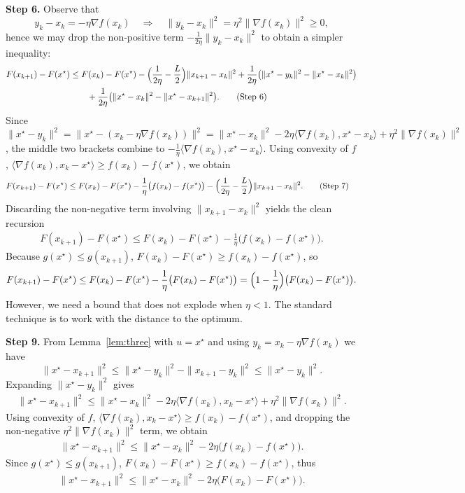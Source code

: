 \documentclass{article}
\begin{document}
\noindent\textbf{Step 6.} Observe that
\[
y_k-x_k = -\eta\nabla f(x_k) \quad\Longrightarrow\quad
\|y_k-x_k\|^2 = \eta^2\|\nabla f(x_k)\|^2\ge0,
\]
hence we may drop the non‑positive term $-\frac{1}{2\eta}\|y_k-x_k\|^2$ to obtain a simpler inequality:
\begin{align}
F(x_{k+1})-F(x^\star)
&\le F(x_k)-F(x^\star)
   -\Bigl(\frac{1}{2\eta}-\frac{L}{2}\Bigr)\|x_{k+1}-x_k\|^2
   +\frac{1}{2\eta}\bigl(\|x^\star-y_k\|^2-\|x^\star-x_k\|^2\bigr) \nonumber\\
&\qquad +\frac{1}{2\eta}\bigl(\|x^\star-x_k\|^2-\|x^\star-x_{k+1}\|^2\bigr). \tag{Step 6}
\end{align}
Since $\|x^\star-y_k\|^2=\|x^\star-(x_k-\eta\nabla f(x_k))\|^2
= \|x^\star-x_k\|^2-2\eta\langle\nabla f(x_k),x^\star-x_k\rangle
+\eta^2\|\nabla f(x_k)\|^2$, the middle two brackets combine to
$-\frac{1}{\eta}\langle\nabla f(x_k),x^\star-x_k\rangle$.
Using convexity of $f$,
$\langle\nabla f(x_k),x_k-x^\star\rangle\ge f(x_k)-f(x^\star)$,
we obtain
\begin{align}
F(x_{k+1})-F(x^\star)
&\le F(x_k)-F(x^\star)
   -\frac{1}{\eta}\bigl(f(x_k)-f(x^\star)\bigr)
   -\Bigl(\frac{1}{2\eta}-\frac{L}{2}\Bigr)\|x_{k+1}-x_k\|^2 . \tag{Step 7}
\end{align}
Discarding the non‑negative term involving $\|x_{k+1}-x_k\|^2$ yields the clean recursion
\begin{align}
F(x_{k+1})-F(x^\star)
\le F(x_k)-F(x^\star)-\frac{1}{\eta}\bigl(f(x_k)-f(x^\star)\bigr). \tag{Step 8}
\end{align}
Because $g(x^\star)\le g(x_{k+1})$, $F(x_k)-F(x^\star)\ge f(x_k)-f(x^\star)$, so
\[
F(x_{k+1})-F(x^\star)\le F(x_k)-F(x^\star)-\frac{1}{\eta}\bigl(F(x_k)-F(x^\star)\bigr)
= \Bigl(1-\frac{1}{\eta}\Bigr)\bigl(F(x_k)-F(x^\star)\bigr). 
\]
However, we need a bound that does not explode when $\eta<1$. The standard technique is to work with the distance to the optimum.

\noindent\textbf{Step 9.} From Lemma~\ref{lem:three} with $u=x^\star$ and using $y_k=x_k-\eta\nabla f(x_k)$ we have
\[
\|x^\star-x_{k+1}\|^2
\le \|x^\star-y_k\|^2-\|x_{k+1}-y_k\|^2
\le \|x^\star-y_k\|^2 .
\]
Expanding $\|x^\star-y_k\|^2$ gives
\begin{align}
\|x^\star-x_{k+1}\|^2
\le \|x^\star-x_k\|^2-2\eta\langle\nabla f(x_k),x_k-x^\star\rangle
+\eta^2\|\nabla f(x_k)\|^2 . \tag{Step 10}
\end{align}
Using convexity of $f$,
$\langle\nabla f(x_k),x_k-x^\star\rangle\ge f(x_k)-f(x^\star)$,
and dropping the non‑negative $\eta^2\|\nabla f(x_k)\|^2$ term, we obtain
\begin{align}
\|x^\star-x_{k+1}\|^2
\le \|x^\star-x_k\|^2-2\eta\bigl(f(x_k)-f(x^\star)\bigr). \tag{Step 11}
\end{align}
Since $g(x^\star)\le g(x_{k+1})$, $F(x_k)-F(x^\star)\ge f(x_k)-f(x^\star)$, thus
\begin{align}
\|x^\star-x_{k+1}\|^2
\le \|x^\star-x_k\|^2-2\eta\bigl(F(x_k)-F(x^\star)\bigr). \tag{Step 12}
\end{align}
\end{document}
